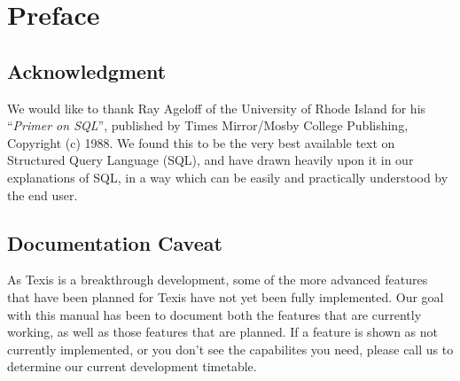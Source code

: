 

\chapter{Preface}

\section{Acknowledgment}

We would like to thank Ray Ageloff of the University of Rhode Island
for his ``{\em Primer on SQL}'', published by Times Mirror/Mosby College
Publishing, Copyright (c) 1988.  We found this to be the very best
available text on Structured Query Language (SQL), and have drawn
heavily upon it in our explanations of SQL, in a way which can be
easily and practically understood by the end user.

\section{Documentation Caveat}

As Texis is a breakthrough development, some of the more advanced
features that have been planned for Texis have not yet been fully
implemented.  Our goal with this manual has been to document both
the features that are currently working, as well as those features
that are planned.  If a feature is shown as not currently
implemented, or you don't see the capabilites you need, please
call us to determine our current development timetable.


